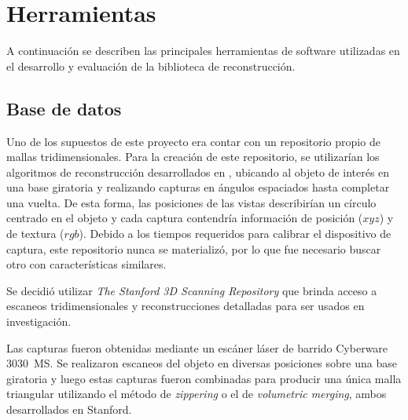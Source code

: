 \chapter{Herramientas}
A continuación se describen las principales herramientas de software
utilizadas en el desarrollo y evaluación de la biblioteca de reconstrucción.

\section{Base de datos}
Uno de los supuestos de este proyecto era contar con un repositorio propio de
mallas tridimensionales.
Para la creación de este repositorio,
se utilizarían los algoritmos de reconstrucción desarrollados en \cite{Pancho},
ubicando al objeto de interés en una base giratoria y realizando capturas
en ángulos espaciados hasta completar una vuelta.
De esta forma, las posiciones de las vistas describirían un círculo centrado en el objeto y
cada captura contendría información de posición ($xyz$) y de textura ($rgb$).
Debido a los tiempos requeridos para calibrar el dispositivo de captura,
este repositorio nunca se materializó,
 por lo que fue necesario buscar otro con características similares.


Se decidió utilizar \emph{The Stanford 3D Scanning Repository}\cite{StanfordScanRep} que brinda
acceso a escaneos tridimensionales y reconstrucciones detalladas para ser
usados en investigación.

Las capturas fueron obtenidas mediante un escáner láser de barrido Cyberware
3030~MS.  Se realizaron escaneos del objeto en diversas posiciones sobre una
base giratoria y luego estas capturas fueron combinadas para producir una única
malla triangular utilizando el método de \emph{zippering}\cite{Turk:1994:ZPM:192161.192241} o el de
\emph{volumetric merging}\cite{Curless:1996:VMB:237170.237269}, ambos desarrollados en
Stanford.


